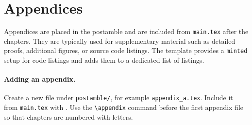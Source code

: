 \section{Appendices}\label{ch6sec:appendices}

Appendices are placed in the postamble and are included from \texttt{main.tex} after the chapters. They are typically used for supplementary material such as detailed proofs, additional figures, or source code listings. The template provides a \texttt{minted} setup for code listings and adds them to a dedicated list of listings.

\paragraph{Adding an appendix.} Create a new file under \texttt{postamble/}, for example \verb|appendix_a.tex|. Include it from \texttt{main.tex} with \verb||. Use the \verb|\appendix| command before the first appendix file so that chapters are numbered with letters.

\begin{figure}[h]
\centering
{}
\hfill
{}
\label{ch6fig:failure}
\end{figure}
